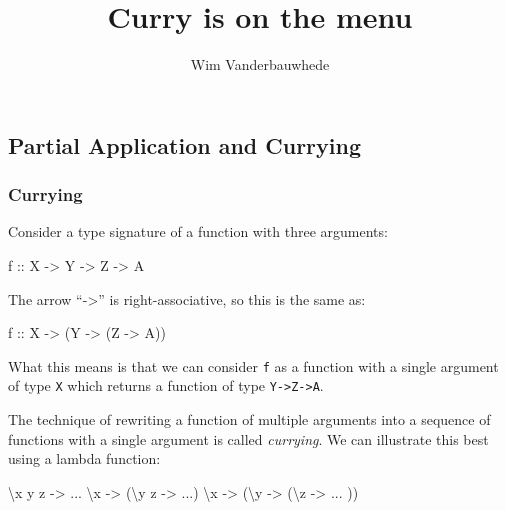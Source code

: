 \documentclass[11pt]{amsart}
\title{Curry is on the menu}
\author{Wim Vanderbauwhede}
\newenvironment{Shaded}{}{}
\newcommand{\DataTypeTok}[1]{\textcolor[rgb]{0.56,0.13,0.00}{{#1}}}
\newcommand{\OtherTok}[1]{\textcolor[rgb]{0.00,0.44,0.13}{{#1}}}
\newcommand{\FunctionTok}[1]{\textcolor[rgb]{0.02,0.16,0.49}{{#1}}}
\newcommand{\NormalTok}[1]{{#1}}
\begin{document}
\maketitle
\subsection{Partial Application and
Currying}\label{partial-application-and-currying}

\subsubsection{Currying}\label{currying}

Consider a type signature of a function with three arguments:

\begin{Shaded}
\begin{Highlighting}[]
\OtherTok{    f ::} \DataTypeTok{X} \OtherTok{->} \DataTypeTok{Y} \OtherTok{->} \DataTypeTok{Z} \OtherTok{->} \DataTypeTok{A}
\end{Highlighting}
\end{Shaded}

The arrow ``-\textgreater{}'' is right-associative, so this is the same
as:

\begin{Shaded}
\begin{Highlighting}[]
\OtherTok{    f ::} \DataTypeTok{X} \OtherTok{->} \NormalTok{(}\DataTypeTok{Y} \OtherTok{->} \NormalTok{(}\DataTypeTok{Z} \OtherTok{->} \DataTypeTok{A}\NormalTok{))}
\end{Highlighting}
\end{Shaded}

What this means is that we can consider \texttt{f} as a function with a
single argument of type \texttt{X} which returns a function of type
\texttt{Y-\textgreater{}Z-\textgreater{}A}.

The technique of rewriting a function of multiple arguments into a
sequence of functions with a single argument is called \emph{currying}.
We can illustrate this best using a lambda function:

\begin{Shaded}
\begin{Highlighting}[]
    \NormalTok{\textbackslash{}x y z }\OtherTok{->} \FunctionTok{...}
    \NormalTok{\textbackslash{}x }\OtherTok{->} \NormalTok{(\textbackslash{}y z }\OtherTok{->} \FunctionTok{...}\NormalTok{)}
    \NormalTok{\textbackslash{}x }\OtherTok{->} \NormalTok{(\textbackslash{}y }\OtherTok{->} \NormalTok{(\textbackslash{}z }\OtherTok{->} \FunctionTok{...} \NormalTok{))  }
\end{Highlighting}
\end{Shaded}
\end{document}
